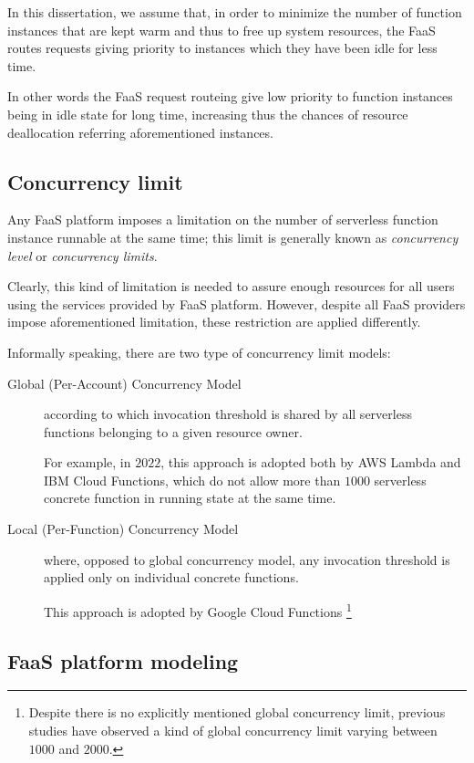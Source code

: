 \documentclass[12pt,a4paper]{report}
\begin{document}
In this dissertation, we assume that, in order to minimize the number of
function instances that are kept warm and thus to free up system resources, the FaaS routes requests giving priority to instances which they have been idle for less time.

In other words the FaaS request routeing give low priority to function instances being in idle state for long time, increasing thus the chances of resource deallocation referring aforementioned instances.

\subsection{Concurrency limit}

Any FaaS platform imposes a limitation on the number of serverless function instance runnable at the same time; this limit is generally known as \textit{concurrency level} or \textit{concurrency limits}. 

Clearly, this kind of limitation is needed to assure enough resources for all users using the services provided by FaaS platform. However, despite all FaaS providers impose aforementioned limitation, these restriction are applied differently.

Informally speaking, there are two type of concurrency limit models:

\begin{description}
	\item[Global (Per-Account) Concurrency Model] according to which invocation threshold is shared by all serverless functions belonging to a given resource owner. 
	
	For example, in $2022$, this approach is adopted both by AWS Lambda and IBM Cloud Functions, which do not allow more than $1000$ serverless concrete function in running state at the same time.
	
	\item[Local (Per-Function) Concurrency Model] where, opposed to global concurrency model, any invocation threshold is applied only on individual concrete functions. 
	
	This approach is adopted by Google Cloud Functions \footnote{Despite there is no explicitly mentioned global concurrency limit, previous studies have observed a kind of global concurrency limit varying between $1000$ and $2000$.}
	
\end{description}

\subsection{FaaS platform modeling}
\end{document}
